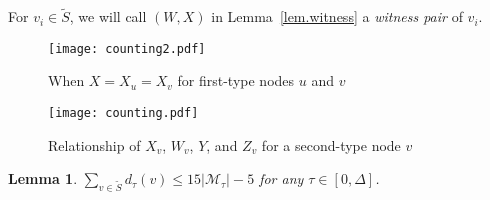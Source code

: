\documentclass[11pt]{article}
\newcommand{\Mfam}{\mathcal{M}}
\newtheorem{lemma}{Lemma}
\begin{document}
  For $v_i \in \tilde{S}$, we will call $(W,X)$ in Lemma~\ref{lem.witness} a
  \emph{witness pair} of $v_i$.

 \begin{figure}[t]
  \centering
 \texttt{[image: counting2.pdf]}
 \caption{When $X=X_u=X_v$ for first-type nodes $u$ and $v$}
 \label{fig:counting2}
 \end{figure}

 \begin{figure}[t]
  \centering
\texttt{[image: counting.pdf]}
 \caption{Relationship of $X_v$, $W_v$, $Y$, and $Z_v$ for a second-type node $v$}
 \label{fig:counting}
 \end{figure}
  
\begin{lemma}\label{lem.degree}
 $\sum_{v \in \tilde{S}} d_{\tau}(v) \leq 15|\Mfam_{\tau}|-5$ for
 any $\tau \in [0,\Delta]$.
\end{lemma}
\end{document}
